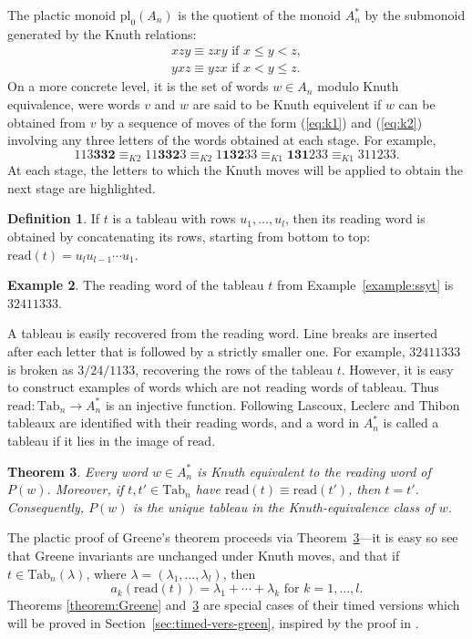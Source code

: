 \documentclass[12pt]{amsart}
\newtheorem{theorem}{Theorem}[subsection]
\theoremstyle{definition}
\newtheorem{definition}[theorem]{Definition}
\newtheorem{example}[theorem]{Example}
\newcommand{\Tab}{\mathrm{Tab}}
\newcommand{\rc}[1]{\mathbf{#1}}
\newcommand{\rd}{\mathrm{read}}
\newcommand{\pl}{\mathrm{pl}}
\begin{document}
The plactic monoid $\pl_0(A_n)$ is the quotient of the monoid $A_n^*$ by the submonoid generated by the Knuth relations:
\begin{gather}
  \tag{$K1$}\label{eq:k1}
  xzy \equiv zxy \text{ if } x\leq y < z,
  \\
  \tag{$K2$}\label{eq:k2}
  yxz \equiv yzx \text{ if } x < y \leq z.
\end{gather}
On a more concrete level, it is the set of words $w\in A_n$ modulo Knuth equivalence, were words $v$ and $w$ are said to be Knuth equivelent if $w$ can be obtained from $v$ by a sequence of moves of the form (\ref{eq:k1}) and (\ref{eq:k2}) involving any three letters of the words obtained at each stage.
For example,
\begin{displaymath}
  113\rc{332}\equiv_{K2} 11\rc{332}3\equiv_{K2} 1\rc{132}33 \equiv_{K1} \rc{131}233 \equiv_{K1} 311233.
\end{displaymath}
At each stage, the letters to which the Knuth moves will be applied to obtain the next stage are highlighted.
\begin{definition}
  If $t$ is a tableau with rows $u_1,\dotsc,u_l$, then its reading word is obtained by concatenating its rows, starting from bottom to top: $\rd(t) = u_lu_{l-1}\dotsb u_1$.
\end{definition}
\begin{example}
  The reading word of the tableau $t$ from Example~\ref{example:ssyt} is $32411333$.
\end{example}
A tableau is easily recovered from the reading word.
Line breaks are inserted after each letter that is followed by a strictly smaller one.
For example, $32411333$ is broken as $3/24/1133$, recovering the rows of the tableau $t$.
However, it is easy to construct examples of words which are not reading words of tableau.
Thus $\rd:\Tab_n\to A_n^*$ is an injective function.
Following Lascoux, Leclerc and Thibon \cite{Lascoux} tableaux are identified with their reading words, and a word in $A_n^*$ is called a tableau if it lies in the image of $\rd$.
\begin{theorem}
  \label{theorem:unique-tab}
  Every word $w\in A_n^*$ is Knuth equivalent to the reading word of $P(w)$.
  Moreover, if $t,t'\in \Tab_n$ have $\rd(t)\equiv \rd(t')$, then $t=t'$.
  Consequently, $P(w)$ is the unique tableau in the Knuth-equivalence class of $w$.
\end{theorem}
The plactic proof of Greene's theorem proceeds via Theorem~\ref{theorem:unique-tab}---it is easy so see that Greene invariants are unchanged under Knuth moves, and that if $t\in \Tab_n(\lambda)$, where $\lambda=(\lambda_1,\dotsc,\lambda_l)$, then
\begin{displaymath}
  a_k(\rd(t)) = \lambda_1+\dotsb +\lambda_k\text{ for }k=1,\dotsc,l.
\end{displaymath}
Theorems \ref{theorem:Greene} and~\ref{theorem:unique-tab} are special cases of their timed versions which will be proved in Section~\ref{sec:timed-vers-green}, inspired by the proof in \cite{Lascoux}.
\end{document}

